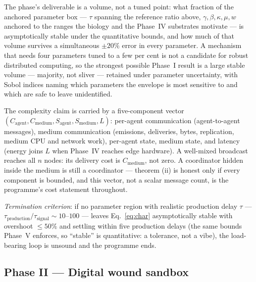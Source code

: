 \documentclass[twoside,twocolumn,usenatbib]{mnras}
\begin{document}
The phase's deliverable is a volume, not a tuned point: what fraction
of the anchored parameter box --- $\tau$ spanning the reference ratio
above, $\gamma, \beta, \kappa, \mu, w$ anchored to the ranges the
biology and the Phase~IV substrates motivate --- is asymptotically
stable under the quantitative bounds, and how much of that volume
survives a simultaneous $\pm 20\%$ error in every parameter. A
mechanism that needs four parameters tuned to a few per cent is not a
candidate for robust distributed computing, so the strongest possible
Phase~I result is a large stable volume --- majority, not sliver ---
retained under parameter uncertainty, with Sobol indices naming which
parameters the envelope is most sensitive to and which are safe to
leave unidentified.

The complexity claim is carried by a five-component vector
$(C_{\mathrm{agent}}, C_{\mathrm{medium}}, S_{\mathrm{agent}},
S_{\mathrm{medium}}, L)$: per-agent communication (agent-to-agent
messages), medium communication (emissions, deliveries, bytes,
replication, medium CPU and network work), per-agent state, medium
state, and latency (energy joins $L$ when Phase~IV reaches edge
hardware). A well-mixed broadcast reaches all $n$ nodes: its delivery
cost is $C_{\mathrm{medium}}$, not zero. A coordinator hidden inside
the medium is still a coordinator --- theorem (ii) is honest only if
every component is bounded, and this vector, not a scalar message
count, is the programme's cost statement throughout.

\emph{Termination criterion}: if no parameter region with realistic
production delay $\tau$ --- $\tau_{\mathrm{production}}/
\tau_{\mathrm{signal}} \sim 10$--$100$ --- leaves
Eq.~\ref{eq:char} asymptotically stable with overshoot $\le 50\%$ and
settling within five production delays (the same bounds Phase~V
enforces, so ``stable'' is quantitative: a tolerance, not a vibe), the
load-bearing loop is unsound and the programme ends.

\subsection{Phase II --- Digital wound sandbox}
\end{document}
